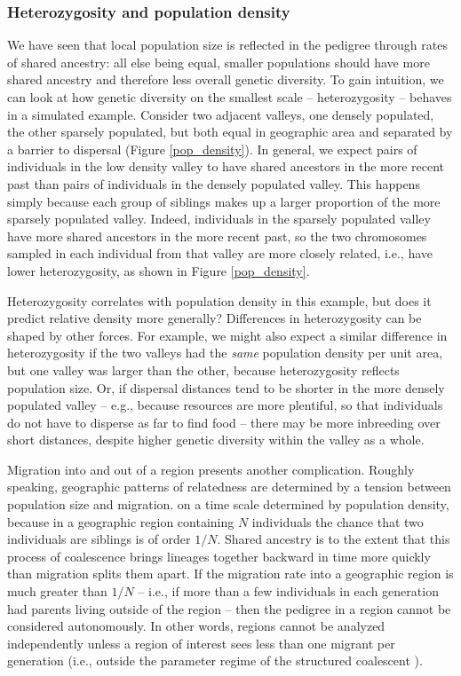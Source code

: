 \documentclass{ar-1col}
\newcommand{\g}[1]{{\color{blue}{#1}}}
\renewcommand{\emph}[1]{{\textit{#1}}}
\begin{document}
\subsubsection{Heterozygosity and population density}

We have seen that
local population size is reflected in the pedigree through rates of shared ancestry:
all else being equal, smaller populations should have more shared ancestry and 
therefore less overall genetic diversity.
To gain intuition, we can look at how genetic diversity on the smallest scale
-- heterozygosity --
behaves in a simulated example.
Consider two adjacent valleys, 
one densely populated, the other sparsely populated, 
but both equal in geographic area 
and separated by a barrier to dispersal (Figure \ref{pop_density}).
In general, we expect pairs of individuals in the low density valley 
to have shared ancestors in the more recent past than 
pairs of individuals in the densely populated valley.
This happens simply because 
each group of siblings makes up a larger proportion 
of the more sparsely populated valley.
Indeed, individuals in the sparsely populated valley 
have more shared ancestors in the more recent past, 
so the two chromosomes sampled in each individual 
from that valley are more closely related,
i.e., have lower heterozygosity, as shown in Figure \ref{pop_density}.

Heterozygosity correlates with population density in this example, 
but does it predict relative density more generally?
Differences in heterozygosity can be shaped by other forces.
For example, we might also expect a similar difference in heterozygosity
if the two valleys had the \emph{same} population density per unit area,
but one valley was larger than the other,
because heterozygosity reflects population size.
Or, if dispersal distances tend to be shorter
in the more densely populated valley -- 
e.g., because resources are more plentiful, 
so that individuals do not have to disperse as far to find food -- 
there may be more inbreeding over short distances,
despite higher genetic diversity within the valley as a whole.

Migration into and out of a region presents another complication.
Roughly speaking,
geographic patterns of relatedness
are determined by a tension between population size and migration.
\g{Genealogical relationships form} on a time scale determined by population density,
because in a geographic region containing $N$ individuals
the chance that two individuals are siblings is of order $1/N$.
Shared ancestry is \g{spatially autocorrelated}
to the extent that this process of coalescence
brings lineages together backward in time more quickly than 
migration splits them apart.
If the migration rate into a geographic region is much greater than $1/N$ --
i.e., if more than a few individuals in each generation had parents living outside of the region --
then the pedigree in a region cannot be considered autonomously.
In other words,
regions cannot be analyzed independently
unless a region of interest sees less than one migrant per generation
(i.e., outside the parameter regime of the structured coalescent \citep{nagylaki1998}).
\end{document}
